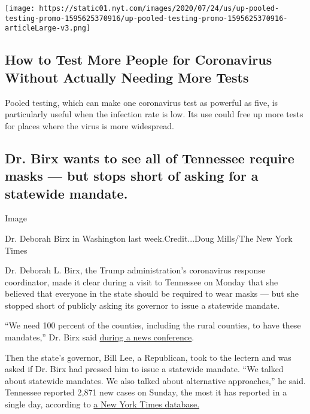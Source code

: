 \texttt{[image: https://static01.nyt.com/images/2020/07/24/us/up-pooled-testing-promo-1595625370916/up-pooled-testing-promo-1595625370916-articleLarge-v3.png]}

\hypertarget{how-to-test-more-people-for-coronavirus-without-actually-needing-more-tests}{%
\subsection{How to Test More People for Coronavirus Without Actually
Needing More
Tests}\label{how-to-test-more-people-for-coronavirus-without-actually-needing-more-tests}}

Pooled testing, which can make one coronavirus test as powerful as five,
is particularly useful when the infection rate is low. Its use could
free up more tests for places where the virus is more widespread.

\hypertarget{dr-birx-wants-to-see-all-of-tennessee-require-masks--but-stops-short-of-asking-for-a-statewide-mandate}{%
\subsection{Dr. Birx wants to see all of Tennessee require masks --- but
stops short of asking for a statewide
mandate.}\label{dr-birx-wants-to-see-all-of-tennessee-require-masks--but-stops-short-of-asking-for-a-statewide-mandate}}

Image

Dr. Deborah Birx in Washington last week.Credit...Doug Mills/The New
York Times

Dr. Deborah L. Birx, the Trump administration's coronavirus response
coordinator, made it clear during a visit to Tennessee on Monday that
she believed that everyone in the state should be required to wear masks
--- but she stopped short of publicly asking its governor to issue a
statewide mandate.

``We need 100 percent of the counties, including the rural counties, to
have these mandates,'' Dr. Birx said
\href{https://www.youtube.com/watch?v=y1UBeX0x-I8}{during a news
conference}.

Then the state's governor, Bill Lee, a Republican, took to the lectern
and was asked if Dr. Birx had pressed him to issue a statewide mandate.
``We talked about statewide mandates. We also talked about alternative
approaches,'' he said. Tennessee reported 2,871 new cases on Sunday, the
most it has reported in a single day, according to
\href{https://www.nytimes.com/interactive/2020/us/tennessee-coronavirus-cases.html}{a
New York Times database.}

